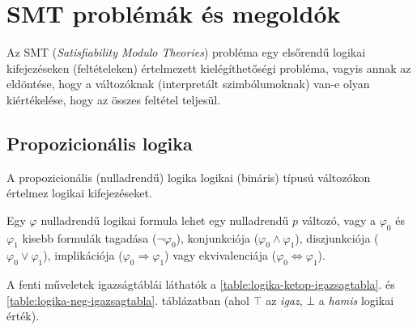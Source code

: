 \section{SMT problémák és megoldók} \label{smt}

Az SMT (\emph{Satisfiability Modulo Theories}) \cite{SMT} probléma egy elsőrendű logikai kifejezéseken (feltételeken) értelmezett kielégíthetőségi probléma, vagyis annak az eldöntése, hogy a változóknak (interpretált szimbólumoknak) van-e olyan kiértékelése, hogy az összes feltétel teljesül.

\subsection{Propozicionális logika}
A propozicionális (nulladrendű) logika \cite{SMTTutorial} logikai (bináris) típusú változókon értelmez logikai kifejezéseket.

Egy $\varphi$ nulladrendű logikai formula lehet egy nulladrendű $p$ változó, vagy a $\varphi_0$ és $\varphi_1$ kisebb formulák tagadása ($\neg \varphi_0$), konjunkciója ($\varphi_0 \wedge \varphi_1$), diszjunkciója ($\varphi_0 \vee \varphi_1$), implikációja ($\varphi_0 \Rightarrow \varphi_1$) vagy ekvivalenciája ($\varphi_0 \Leftrightarrow \varphi_1$).

A fenti műveletek igazságtáblái láthatók a \ref{table:logika-ketop-igazsagtabla}. és \ref{table:logika-neg-igazsagtabla}. táblázatban (ahol $\top$ az \emph{igaz}, $\bot$ a \emph{hamis} logikai érték).


